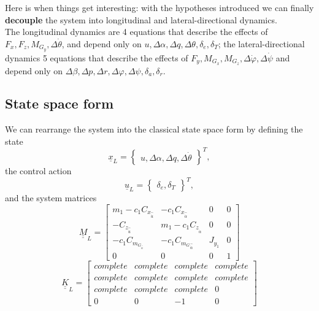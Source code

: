 Here is when things get interesting: with the hypotheses introduced we can finally \textbf{decouple} the system into longitudinal and lateral-directional dynamics.
\\
The longitudinal dynamics are 4 equations that describe the effects of $F_x, F_z, M_{G_y},\Delta \dot \theta$,  and depend only on $u, \Delta \alpha, \Delta q, \Delta \theta, \delta_e, \delta_T$; the lateral-directional dynamics 5 equations that describe the effects of $F_y, M_{G_x}, M_{G_z}, \Delta \dot \varphi, \Delta \dot \psi$ and depend only on $\Delta \beta, \Delta p, \Delta r, \Delta \varphi, \Delta \psi, \delta_a, \delta_r$.
\subsection{State space form}
We can rearrange the system into the classical state space form by defining the state
\begin{equation}
    \underline{x}_L = \begin{Bmatrix}
        u, \Delta \alpha, \Delta q, \Delta \dot \theta
    \end{Bmatrix}^T,
\end{equation}
the control action
\begin{equation}
    \underline{u}_L = \begin{Bmatrix}
        \delta_e, \delta_T
    \end{Bmatrix}^T,
\end{equation}
and the system matrices
\begin{equation}
    \underline{\underline{M}}_L = \begin{bmatrix}
        m_1 -c_1C_{x_{\hat{\dot u}}}    & -c_1 C_{x_{\hat{\dot \alpha}}}        & 0         & 0\\
        -C_{z_{\hat{\dot u}}}           & m_1-c_1 C_{z_{\hat{\dot \alpha}}}     & 0         & 0\\
        -c_1C_{m_{G_{\hat{\dot u}}}}    & -c_1 C_{m_G{_{\hat{\dot \alpha}}}}    & J_{y_1}   & 0\\
        0                               & 0                                     & 0         & 1
    \end{bmatrix}
\end{equation}
\begin{equation}
    \underline{\underline{K}}_L = \begin{bmatrix}
        complete    &complete       & complete         & complete \\
       complete           & complete     & complete         & complete \\
        complete    & complete    &complete  & 0 \\
        0                               & 0                                     & -1         & 0
    \end{bmatrix}
\end{equation}
